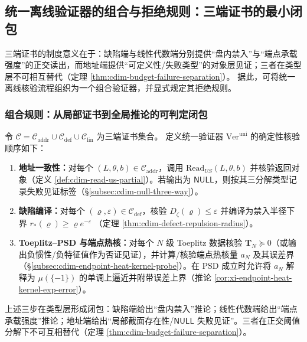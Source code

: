 \subsection{统一离线验证器的组合与拒绝规则：三端证书的最小闭包}\label{subsec:cdim-unified-offline-verifier-closure}
三端证书的制度意义在于：缺陷端与线性代数端分别提供“盘内禁入”与“端点承载强度”的正交读出，而地址端提供“可定义性/失败类型”的对象层见证；三者在类型层不可相互替代（定理 \ref{thm:cdim-budget-failure-separation}）。
据此，可将统一离线核验流程组织为一个组合验证器，并显式规定其拒绝规则。

\subsubsection{组合规则：从局部证书到全局推论的可判定闭包}\label{subsubsec:cdim-unified-offline-verifier-composition}
令
\(
\mathcal{C}=\mathcal{C}_{\mathrm{addr}}\cup\mathcal{C}_{\mathrm{def}}\cup\mathcal{C}_{\mathrm{lin}}
\)
为三端证书集合。
定义统一验证器 \(\mathrm{Ver}^{\mathrm{uni}}\) 的确定性核验顺序如下：
\begin{enumerate}
  \item \textbf{地址一致性：}对每个 \((L,\theta,b)\in\mathcal{C}_{\mathrm{addr}}\)，调用 \(\mathrm{Read}_{US}(L,\theta,b)\) 并核验返回对象（定义 \ref{def:cdim-read-us-partial}）。若输出为 \(\mathsf{NULL}\)，则按其三分解类型记录失败见证标签（\S\ref{subsec:cdim-null-three-way}）。
  \item \textbf{缺陷编译：}对每个 \((\varrho,\varepsilon)\in\mathcal{C}_{\mathrm{def}}\)，核验 \(D_{\zeta}(\varrho)\le \varepsilon\) 并编译为禁入半径下界
  \(
  r_{\ast}(\varrho)\ge \varrho e^{-\varepsilon}
  \)
  （定理 \ref{thm:cdim-defect-repulsion-radius}）。
  \item \textbf{Toeplitz--PSD 与端点热核：}对每个 \(N\) 级 Toeplitz 数据核验 \(\mathbf{T}_N\succeq 0\)（或输出负惯性/负特征值作为否证见证），并计算/核验端点热核量 \(a_N\) 及其误差界（\S\ref{subsec:cdim-endpoint-heat-kernel-probe}）。在 PSD 成立时允许将 \(a_N\) 解释为 \(\mu(\{-1\})\) 的单调上逼近并附带误差上界（推论 \ref{cor:xi-endpoint-heat-kernel-exp-error}）。
\end{enumerate}
上述三步在类型层形成闭包：缺陷端给出“盘内禁入”推论；线性代数端给出“端点承载强度”推论；地址端给出“局部截面存在性/\(\mathsf{NULL}\) 失败见证”。三者在正交阈值分解下不可互相替代（定理 \ref{thm:cdim-budget-failure-separation}）。

